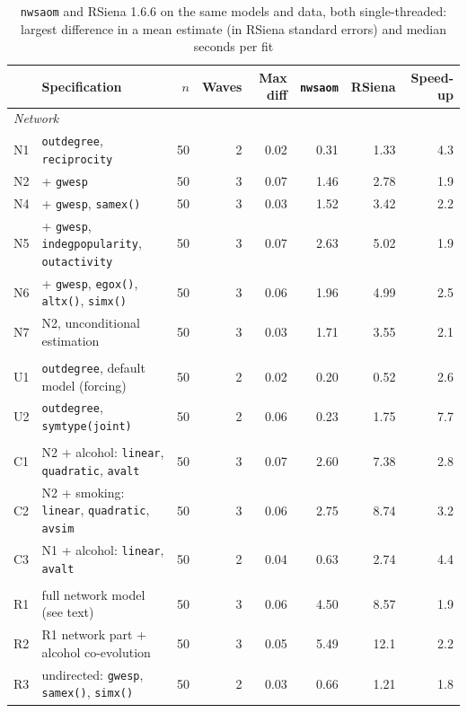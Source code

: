 \begin{table}[htbp]
\centering
\caption{\texttt{nwsaom} and RSiena 1.6.6 on the same models and data, both single-threaded:
largest difference in a mean estimate (in RSiena standard errors) and median seconds per fit}
\label{tab:bench}
\footnotesize
\begin{tabular}{l>{\raggedright\arraybackslash}p{}rrrrrr}
\toprule
 & Specification & $n$ & Waves & Max diff & \texttt{nwsaom} & RSiena & Speed-up \\
\midrule
\multicolumn{8}{l}{\textit{Network}} \\
N1 & \texttt{outdegree}, \texttt{reciprocity} & 50 & 2 & 0.02 & 0.31 & 1.33 & 4.3 \\
N2 & + \texttt{gwesp} & 50 & 3 & 0.07 & 1.46 & 2.78 & 1.9 \\
N4 & + \texttt{gwesp}, \texttt{samex()} & 50 & 3 & 0.03 & 1.52 & 3.42 & 2.2 \\
N5 & + \texttt{gwesp}, \texttt{indegpopularity}, \texttt{outactivity} & 50 & 3 & 0.07 & 2.63 & 5.02 & 1.9 \\
N6 & + \texttt{gwesp}, \texttt{egox()}, \texttt{altx()}, \texttt{simx()} & 50 & 3 & 0.06 & 1.96 & 4.99 & 2.5 \\
N7 & N2, unconditional estimation & 50 & 3 & 0.03 & 1.71 & 3.55 & 2.1 \\
\addlinespace
\multicolumn{8}{l}{\textit{Undirected}} \\
U1 & \texttt{outdegree}, default model (forcing) & 50 & 2 & 0.02 & 0.20 & 0.52 & 2.6 \\
U2 & \texttt{outdegree}, \texttt{symtype(joint)} & 50 & 2 & 0.06 & 0.23 & 1.75 & 7.7 \\
\addlinespace
\multicolumn{8}{l}{\textit{Co-evolution}} \\
C1 & N2 + alcohol: \texttt{linear}, \texttt{quadratic}, \texttt{avalt} & 50 & 3 & 0.07 & 2.60 & 7.38 & 2.8 \\
C2 & N2 + smoking: \texttt{linear}, \texttt{quadratic}, \texttt{avsim} & 50 & 3 & 0.06 & 2.75 & 8.74 & 3.2 \\
C3 & N1 + alcohol: \texttt{linear}, \texttt{avalt} & 50 & 2 & 0.04 & 0.63 & 2.74 & 4.4 \\
\addlinespace
\multicolumn{8}{l}{\textit{Realistic}} \\
R1 & full network model (see text) & 50 & 3 & 0.06 & 4.50 & 8.57 & 1.9 \\
R2 & R1 network part + alcohol co-evolution & 50 & 3 & 0.05 & 5.49 & 12.1 & 2.2 \\
R3 & undirected: \texttt{gwesp}, \texttt{samex()}, \texttt{simx()} & 50 & 2 & 0.03 & 0.66 & 1.21 & 1.8 \\

\end{tabular}
\end{table}
